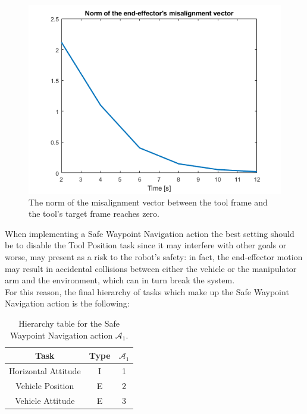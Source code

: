 \documentclass{article}
\begin{document}
\begin{figure}[H]
	\centering
	\includegraphics[width=0.7\linewidth]{images/Ex1/HorAtt_Disabled_Tool_Enabled_MisalignVectNorm}
	\caption{The norm of the misalignment vector between the tool frame and the tool's target frame reaches zero.}
	\label{fig:q4d}
\end{figure}

When implementing a Safe Waypoint Navigation action the best setting should be to disable the Tool Position task since it may interfere with other goals or worse, may present as a risk to the robot's safety: in fact, the end-effector motion may result in accidental collisions between either the vehicle or the manipulator arm and the environment, which can in turn break the system. \\
For this reason, the final hierarchy of tasks which make up the Safe Waypoint Navigation action is the following:
\begin{table}[htb]
	\caption{Hierarchy table for the Safe Waypoint Navigation action $\mathcal{A}_{1}$.}
	\label{tb1:ex1.1.4SafeWaypointNavigationTable}
	\begin{center}
		\footnotesize
		\begin{tabular}{ccc}
			\toprule
			Task & Type & $\mathcal{A}_{1}$ \\
			\midrule
			Horizontal Attitude & I & 1 \\
			\hdashline
			Vehicle Position    & E & 2 \\
			\hdashline
			Vehicle Attitude    & E & 3 \\
			\bottomrule
		\end{tabular}
	\end{center}
\end{table}
\end{document}
